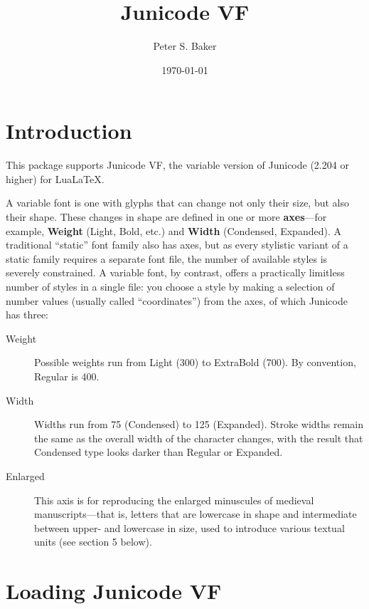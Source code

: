 \documentclass[12pt]{article}
\title{Junicode VF}
\author{Peter S. Baker}
\date{\today}
\newcommand{\lltech}{Lua\LaTeX}
\begin{document}
\maketitle

\section{Introduction}

\pagestyle{fancy}

This package supports Junicode VF, the variable version of Junicode
(2.204 or higher) for \lltech.

A variable font is one with glyphs that can change not only their size, but also their
shape. These changes in shape are defined in one or more \textbf{axes}---for example,
\textbf{Weight} (Light, Bold, etc.) and \textbf{Width} (Condensed, Expanded). A traditional
“static” font family also has axes, but as every stylistic variant of a static family
requires a separate font file,
the number of available styles is severely constrained. A variable font, by contrast,
offers a practically limitless number of styles in a single file: you choose a style
by making a selection of number values (usually called “coordinates”) from the axes, 
of which Junicode has three:

\begin{description}
    \item[Weight] Possible weights run from Light (300) to ExtraBold (700). By
    convention, Regular is 400.
    \item[Width] Widths run from 75 (Condensed) to 125 (Expanded). Stroke widths remain
    the same as the overall width of the character changes, with the result that
    Condensed type looks darker than Regular or Expanded.
    \item[Enlarged] This axis is for reproducing the enlarged minuscules of medieval
    manuscripts---that is, letters that are lowercase in shape and intermediate between
    upper- and lowercase in size, used to introduce various textual units (see section
    5 below).
\end{description}

\section{Loading Junicode VF}
\end{document}
